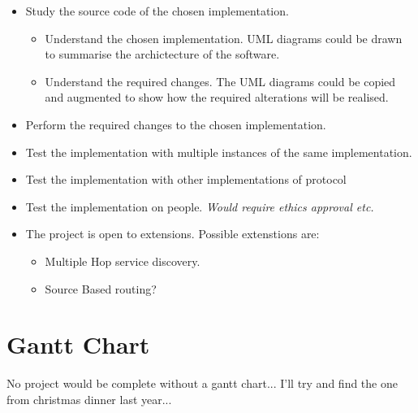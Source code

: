 \documentclass[12pt]{report}
\begin{document}
\begin{itemize}

\item Study the source code of the chosen implementation.

\begin{itemize}

\item Understand the chosen implementation.
UML diagrams could be drawn to summarise the archictecture of the software. 

\item Understand the required changes.
The UML diagrams could be copied and augmented to show how the required alterations will be realised. 

\end{itemize}

\item Perform the required changes to the chosen implementation.
\item Test the implementation with multiple instances of the same implementation.
\item Test the implementation with other implementations of protocol 
\item Test the implementation on people. \em Would require ethics approval etc. \em

\item The project is open to extensions. Possible extenstions are:

\begin{itemize}
\item Multiple Hop service discovery.
\item Source Based routing?
\end{itemize}

\end{itemize}

\section{Gantt Chart}
No project would be complete without a gantt chart... I'll try and find the one from christmas dinner last year...
\end{document}
